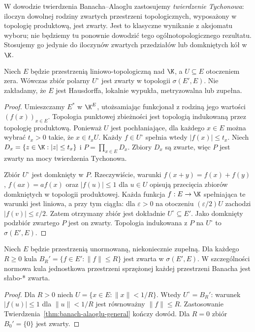 \begin{uwaga}
W dowodzie twierdzenia Banacha--Alaoglu zastosujemy \emph{twierdzenie
Tychonowa}: iloczyn dowolnej rodziny zwartych przestrzeni topologicznych,
wyposażony w topologię produktową, jest zwarty. Jest to klasyczne
wynikanie z aksjomatu wyboru; nie będziemy tu ponownie dowodzić
tego ogólnotopologicznego rezultatu. Stosujemy go jedynie do iloczynów
zwartych przedziałów lub domkniętych kół w $\K$.
\end{uwaga}

\begin{twierdzenie}\label{thm:banach-alaoglu-general}
Niech $E$ będzie przestrzenią liniowo-topologiczną nad $\K$, a
$U\subseteq E$ otoczeniem zera. Wówczas zbiór polarny $U^\circ$
jest zwarty w topologii $\sigma(E',E)$.
Nie zakładamy, że $E$ jest Hausdorffa, lokalnie wypukła, metryzowalna
lub zupełna.
\end{twierdzenie}
\begin{proof}
Umieszczamy $E^*$ w $\K^E$, utożsamiając funkcjonał z rodziną
jego wartości $(f(x))_{x\in E}$. Topologia punktowej zbieżności
jest topologią indukowaną przez topologię produktową.
Ponieważ $U$ jest pochłaniające, dla każdego $x\in E$ można wybrać
$t_x>0$ takie, że $x\in t_xU$. Każdy $f\in U^\circ$ spełnia wtedy
$|f(x)|\le t_x$. Niech $D_x=\{z\in\K:|z|\le t_x\}$ i
$P=\prod_{x\in E}D_x$. Zbiory $D_x$ są zwarte, więc $P$ jest zwarty
na mocy twierdzenia Tychonowa.

Zbiór $U^\circ$ jest domknięty w $P$. Rzeczywiście, warunki
$f(x+y)=f(x)+f(y)$, $f(ax)=af(x)$ oraz $|f(u)|\le1$ dla $u\in U$
opisują przecięcia zbiorów domkniętych w topologii produktowej.
Każda funkcja $f:E\to\K$ spełniająca te warunki jest liniowa,
a przy tym ciągła: dla $\varepsilon>0$ na otoczeniu
$(\varepsilon/2)U$ zachodzi $|f(v)|\le\varepsilon/2$.
Zatem otrzymany zbiór jest dokładnie $U^\circ\subseteq E'$.
Jako domknięty podzbiór zwartego $P$ jest on zwarty. Topologia
indukowana z $P$ na $U^\circ$ to $\sigma(E',E)$.
\end{proof}

\begin{wniosek}\label{cor:alaoglu-norm}
Niech $E$ będzie przestrzenią unormowaną, niekoniecznie zupełną.
Dla każdego $R\ge0$ kula
$B_R'=\{f\in E':\|f\|\le R\}$ jest zwarta w $\sigma(E',E)$.
W szczególności normowa kula jednostkowa przestrzeni sprzężonej
każdej przestrzeni Banacha jest słabo-* zwarta.
\end{wniosek}
\begin{proof}
Dla $R>0$ niech $U=\{x\in E:\|x\|<1/R\}$.
Wtedy $U^\circ=B_R'$: warunek $|f(u)|\le1$ dla $\|u\|<1/R$
jest równoważny $\|f\|\le R$. Zastosowanie
Twierdzenia~\ref{thm:banach-alaoglu-general} kończy dowód.
Dla $R=0$ zbiór $B_0'=\{0\}$ jest zwarty.
\end{proof}

